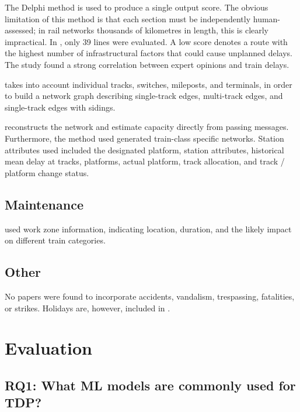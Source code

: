 \documentclass{article}
\begin{document}
The Delphi method is used to produce a single output score. The obvious limitation of this method is that each section must be independently human-assessed; in rail networks thousands of kilometres in length, this is clearly impractical.  In \cite{markovic_et_al_2015}, only 39 lines were evaluated. A low score denotes a route with the highest number of infrastructural factors that could cause unplanned delays. The study found a strong correlation between expert opinions and train delays. 

\cite{barbour_et_al_2018} takes into account individual tracks, switches, mileposts, and terminals, in order to build a network graph describing single-track edges, multi-track edges, and single-track edges with sidings. 

\cite{nair_et_al_2019} reconstructs the network and estimate capacity directly from passing messages. Furthermore, the method used generated train-class specific networks. Station attributes used included the designated platform, station attributes, historical mean delay at tracks, platforms, actual platform, track allocation, and track / platform change status.


\subsection{Maintenance}

\cite{nair_et_al_2019} used work zone information, indicating location, duration, and the likely impact on different train categories.


\subsection{Other}

No papers were found to incorporate accidents, vandalism, trespassing, fatalities, or strikes. Holidays are, however, included in \cite{nair_et_al_2019}\cite{oneto_et_al_2017b}.

\section{Evaluation}

\subsection{RQ1: What ML models are commonly used for TDP?}
\end{document}
